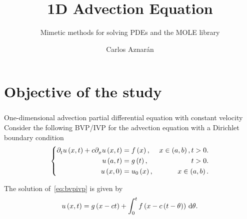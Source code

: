 \documentclass[
	8pt,
	professionalfonts,
	leqno,
	intlimits,
	c,
    aspectratio=1610,
]{beamer}
\title{1D Advection Equation}
\subtitle{Mimetic methods for solving PDEs and the MOLE library}
\author{Carlos Aznarán}
\begin{document}
\begin{frame}
    \maketitle
\end{frame}

\section{Objective of the study}

\begin{frame}
    \frametitle{\secname}
    \begin{block}{One-dimensional advection partial differential equation with constant velocity}
        Consider the following BVP/IVP for the advection equation
        with a Dirichlet boundary condition
        \begin{equation}\label{eq:bvpivp}
            \left\{
            \begin{aligned}
                \difcp{u}{t}\left(x,t\right)+
                c
                \difcp{u}{x}\left(x,t\right) & =
                f\left(x\right),             & x\in\left(a,b\right), t>0. \\
                u\left(a,t\right)            & =
                g\left(t\right),             & t>0.                       \\
                u\left(x,0\right)            & =
                u_{0}\left(x\right),         & x\in\left(a,b\right).
            \end{aligned}
            \right.
        \end{equation}

        The solution of~\eqref{eq:bvpivp} is given by
        \begin{equation*}
            u\left(x,t\right)=
            g\left(x-ct\right)+
            \int_{0}^{t}
            f\left(x-c\left(t-\theta\right)\right)\dl\theta. %
        \end{equation*}
    \end{block}


\end{frame}
\end{document}
